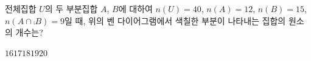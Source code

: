 \noindent\begin{minipage}[t]{0.58\linewidth}\vspace{0pt}\raggedright 전체집합 $U$의 두 부분집합 $A$, $B$에 대하여 $n(U)=40$, $n(A)=12$, $n(B)=15$, $n(A\cap\comp{B})=9$일 때, 위의 벤 다이어그램에서 색칠한 부분이 나타내는 집합의 원소의 개수는?\end{minipage}\hfill\begin{minipage}[t]{0.4\linewidth}\vspace{0pt}\centering \resizebox{\ifdim\width>\linewidth\linewidth\else\width\fi}{!}{}\end{minipage}\par
\begin{choices32}{$16$}{$17$}{$18$}{$19$}{$20$}\end{choices32}
